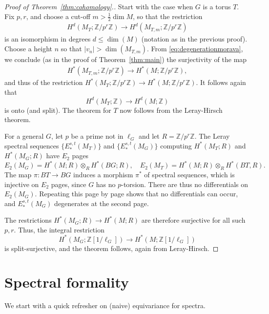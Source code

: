\documentclass[11pt, reqno]{amsart}
\theoremstyle{plain}
\theoremstyle{definition}
\begin{document}
\begin{proof} [Proof of Theorem~\ref{thm:cohomology}.]
Start with the case when $G$ is a torus $T$. Fix $p, r$, and choose a cut-off $m>\frac{1}{2}\dim M$, 
so that the restriction 
\begin{align}\label{eq:splittingEGn} 
H^d(M_T;\mathbb{Z}/p^r\mathbb{Z}) \to  H^d(M_{T,m};\mathbb{Z}/p^r\mathbb{Z}) 
\end{align} 
is an isomorphism in  degrees $d \leq \dim(M)$ (notation as in the previous proof). 
Choose a height $n$ so that $|v_n|>\dim(M_{T,m})$. From \eqref{eq:degenerationmorava}, 
we conclude (as in the proof of Theorem~\ref{thm:main}) the surjectivity of the map 
\begin{align} \label{eq:degenerationm} 
H^*(M_{T,m};\mathbb{Z}/p^r\mathbb{Z}) \to H^*(M;\mathbb{Z}/p^r\mathbb{Z}), 
\end{align} 
and thus of the restriction $H^*(M_{T}; \mathbb{Z}/p^r\mathbb{Z}) \to H^*(M;\mathbb{Z}/p^r\mathbb{Z})$.  
It follows again that 
\[
H^d(M_{T}; \mathbb{Z}) \to H^d(M;\mathbb{Z}) 
\] 
is onto (and  split).   The theorem for $T$ now follows from the Leray-Hirsch theorem.  

For a general $G$, let $p$ be a prime not in  $\ell_G$ and let $R=\mathbb{Z}/p^r\mathbb{Z}$. 
The Leray spectral sequences $\lbrace E_*^{s,t}(M_T) \rbrace$ and $\lbrace E_*^{s,t}(M_G) \rbrace$ 
computing $H^*(M_T;R)$ and $H^*(M_G;R)$ have $E_2$ pages 
\[
E_2(M_G) = H^*(M;R) \otimes_{R} H^*(BG; R), \quad E_2(M_T) = H^*(M; R) 
\otimes_R H^*(BT, R).
\]
The map $\pi:BT\to BG$ induces a morphism $\pi^*$ of spectral sequences, which is injective on $E_2$ pages, 
since  $G$ has no $p$-torsion. There are thus no differentials on $E_2(M_G)$. Repeating this page by page 
shows that no differentials can occur, and $E^{s,t}_*(M_G)$ degenerates at the second page. 

The restrictions $H^*(M_G;R) \to H^*(M;R)$ are therefore surjective for all such $p,r$. 
Thus, the integral restriction  
\[ 
H^*(M_{G}; \mathbb{Z}[1/\ell_G]) \to H^*(M;\mathbb{Z}[1/\ell_G]) 
\]
is split-surjective, and the theorem follows, again from Leray-Hirsch.  
\end{proof}
  


\section{Spectral formality} 
\label{sec:specformal}

We start with a quick refresher on (naive) equivariance for spectra.
\end{document}
